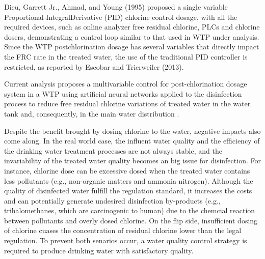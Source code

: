 Dieu, Garrett Jr., Ahmad, and Young (1995) proposed a single variable Proportional-IntegralDerivative (PID) chlorine control dosage, with all the required devices, such as online analyzer free residual chlorine, PLCs and chlorine dosers, demonstrating a control loop similar to that used in WTP under analysis. Since the WTP postchlorination dosage has several variables that directly impact the FRC rate in the treated water, the use of the traditional PID controller is restricted, as reported by Escobar and Trierweiler (2013).

Current analysis proposes a multivariable control for post-chlorination dosage system in a WTP using artificial neural networks applied to the disinfection process to reduce free residual chlorine variations of treated water in the water tank and, consequently, in the main water distribution \cite{librantz_artificial_2018}.

Despite the benefit brought by dosing chlorine to the water, negative impacts also come along. In the real world case, the influent water quality and the efficiency of the drinking water treatment processes are not always stable, and the invariability of the treated water quality becomes an big issue for disinfection. For instance, chlorine dose can be excessive dosed when the treated water contains less pollutants (e.g., non-organic matters and ammonia nitrogen). Although the quality of disinfected water fulfill the regulation standard, it increases the costs and can potentially generate undesired disinfection by-products (e.g., trihalomethanes, which are carcinogenic to human) due to the chemcial reaction between pollutants and overly dosed chlorine. On the flip side, insufficient dosing of chlorine cuases the concentration of residual chlorine lower than the legal regulation. To prevent both senarios occur, a water quality control strategy is required to produce drinking water with satisfactory quality. 

